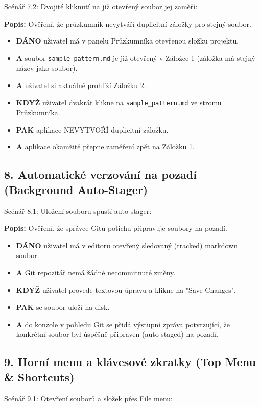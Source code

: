 \documentclass[12pt, a4paper]{article}
\begin{document}
Scénář 7.2: Dvojité kliknutí na již otevřený soubor jej zaměří:

\textbf{Popis:} Ověření, že průzkumník nevytváří duplicitní záložky pro stejný soubor.
\begin{itemize}
    \item \textbf{DÁNO} uživatel má v panelu Průzkumníka otevřenou složku projektu.
    \item \textbf{A} soubor \texttt{sample\_pattern.md} je již otevřený v Záložce 1 (záložka má stejný název jako soubor).
    \item \textbf{A} uživatel si aktuálně prohlíží Záložku 2.
    \item \textbf{KDYŽ} uživatel dvakrát klikne na \texttt{sample\_pattern.md} ve stromu Průzkumníka.
    \item \textbf{PAK} aplikace NEVYTVOŘÍ duplicitní záložku.
    \item \textbf{A} aplikace okamžitě přepne zaměření zpět na Záložku 1.
\end{itemize}

\subsection*{8. Automatické verzování na pozadí (Background Auto-Stager)}

Scénář 8.1: Uložení souboru spustí auto-stager:

\textbf{Popis:} Ověření, že správce Gitu potichu připravuje soubory na pozadí.
\begin{itemize}
    \item \textbf{DÁNO} uživatel má v editoru otevřený sledovaný (tracked) markdown soubor.
    \item \textbf{A} Git repozitář nemá žádné necommitnuté změny.
    \item \textbf{KDYŽ} uživatel provede textovou úpravu a klikne na "Save Changes".
    \item \textbf{PAK} se soubor uloží na disk.
    \item \textbf{A} do konzole v pohledu Git se přidá výstupní zpráva potvrzující, že konkrétní soubor byl úspěšně připraven (auto-staged) na pozadí.
\end{itemize}

\subsection*{9. Horní menu a klávesové zkratky (Top Menu \& Shortcuts)}

Scénář 9.1: Otevření souborů a složek přes File menu:
\end{document}
